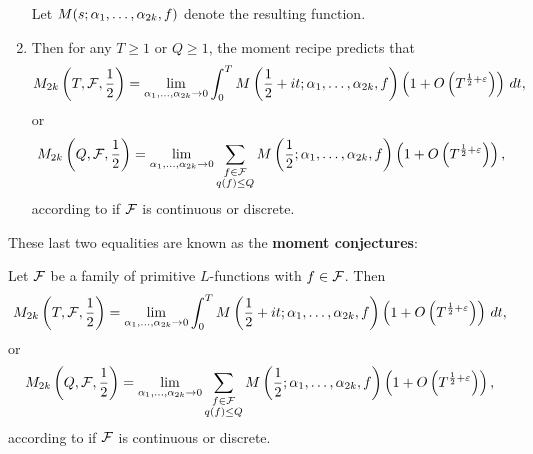 \begin{enumerate}[label*=(\roman*)]
\[    \]
    Let $M(s;\alpha_{1},\ldots,\alpha_{2k},f)$ denote the resulting function.
    \item Then for any $T \ge 1$ or $Q \ge 1$, the moment recipe predicts that
    \[
      M_{2k}\left(T,\mathcal{F},\frac{1}{2}\right) = \lim_{\alpha_{1},\ldots,\alpha_{2k} \to 0}\int_{0}^{T}M\left(\frac{1}{2}+it;\alpha_{1},\ldots,\alpha_{2k},f\right)\left(1+O\left(T^{\frac{1}{2}+\varepsilon}\right)\right)\,dt,
    \]
    or
    \[
       M_{2k}\left(Q,\mathcal{F},\frac{1}{2}\right) = \lim_{\alpha_{1},\ldots,\alpha_{2k} \to 0}\sum_{\substack{f \in \mathcal{F} \\ q(f) \le Q}}M\left(\frac{1}{2};\alpha_{1},\ldots,\alpha_{2k},f\right)\left(1+O\left(T^{\frac{1}{2}+\varepsilon}\right)\right),
    \]
    according to if $\mathcal{F}$ is continuous or discrete.
  \end{enumerate}

  These last two equalities are known as the \textbf{moment conjectures}:

  \begin{conjecture}
    Let $\mathcal{F}$ be a family of primitive $L$-functions with $f \in \mathcal{F}$. Then
    \[
      M_{2k}\left(T,\mathcal{F},\frac{1}{2}\right) = \lim_{\alpha_{1},\ldots,\alpha_{2k} \to 0}\int_{0}^{T}M\left(\frac{1}{2}+it;\alpha_{1},\ldots,\alpha_{2k},f\right)\left(1+O\left(T^{\frac{1}{2}+\varepsilon}\right)\right)\,dt,
    \]
    or
    \[
       M_{2k}\left(Q,\mathcal{F},\frac{1}{2}\right) = \lim_{\alpha_{1},\ldots,\alpha_{2k} \to 0}\sum_{\substack{f \in \mathcal{F} \\ q(f) \le Q}}M\left(\frac{1}{2};\alpha_{1},\ldots,\alpha_{2k},f\right)\left(1+O\left(T^{\frac{1}{2}+\varepsilon}\right)\right),
    \]
    according to if $\mathcal{F}$ is continuous or discrete.
  \end{conjecture}